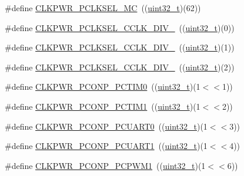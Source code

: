 \begin{DoxyCompactItemize}
\item 
\#define \hyperlink{group___c_l_k_p_w_r___public___macros_ga6f1c261af43582c0e9b2bc3ac5e603d1}{C\+L\+K\+P\+W\+R\+\_\+\+P\+C\+L\+K\+S\+E\+L\+\_\+\+MC}~((\hyperlink{_p_e___types_8h_a33594304e786b158f3fb30289278f5af}{uint32\+\_\+t})(62))
\item 
\#define \hyperlink{group___c_l_k_p_w_r___public___macros_gaf7b612823ab87d3d6358df977364b547}{C\+L\+K\+P\+W\+R\+\_\+\+P\+C\+L\+K\+S\+E\+L\+\_\+\+C\+C\+L\+K\+\_\+\+D\+I\+V\+\_}~((\hyperlink{_p_e___types_8h_a33594304e786b158f3fb30289278f5af}{uint32\+\_\+t})(0))
\item 
\#define \hyperlink{group___c_l_k_p_w_r___public___macros_ga9aaf02f3090e8a9208d261c0f984c165}{C\+L\+K\+P\+W\+R\+\_\+\+P\+C\+L\+K\+S\+E\+L\+\_\+\+C\+C\+L\+K\+\_\+\+D\+I\+V\+\_}~((\hyperlink{_p_e___types_8h_a33594304e786b158f3fb30289278f5af}{uint32\+\_\+t})(1))
\item 
\#define \hyperlink{group___c_l_k_p_w_r___public___macros_ga07e1e67993eb7f67f2b9bca8e7a1d8c8}{C\+L\+K\+P\+W\+R\+\_\+\+P\+C\+L\+K\+S\+E\+L\+\_\+\+C\+C\+L\+K\+\_\+\+D\+I\+V\+\_}~((\hyperlink{_p_e___types_8h_a33594304e786b158f3fb30289278f5af}{uint32\+\_\+t})(2))
\item 
\#define \hyperlink{group___c_l_k_p_w_r___public___macros_ga8fcd9a64da1ce162e567fd58f93361e9}{C\+L\+K\+P\+W\+R\+\_\+\+P\+C\+O\+N\+P\+\_\+\+P\+C\+T\+I\+M0}~((\hyperlink{_p_e___types_8h_a33594304e786b158f3fb30289278f5af}{uint32\+\_\+t})(1$<$$<$1))
\item 
\#define \hyperlink{group___c_l_k_p_w_r___public___macros_gabb4fde316626be32ef910804a4f1e89f}{C\+L\+K\+P\+W\+R\+\_\+\+P\+C\+O\+N\+P\+\_\+\+P\+C\+T\+I\+M1}~((\hyperlink{_p_e___types_8h_a33594304e786b158f3fb30289278f5af}{uint32\+\_\+t})(1$<$$<$2))
\item 
\#define \hyperlink{group___c_l_k_p_w_r___public___macros_ga25e8807a1107e45cb604e0cdf82da4dd}{C\+L\+K\+P\+W\+R\+\_\+\+P\+C\+O\+N\+P\+\_\+\+P\+C\+U\+A\+R\+T0}~((\hyperlink{_p_e___types_8h_a33594304e786b158f3fb30289278f5af}{uint32\+\_\+t})(1$<$$<$3))
\item 
\#define \hyperlink{group___c_l_k_p_w_r___public___macros_gaa4d6d3d86ee08058a5879fc8a3eeab25}{C\+L\+K\+P\+W\+R\+\_\+\+P\+C\+O\+N\+P\+\_\+\+P\+C\+U\+A\+R\+T1}~((\hyperlink{_p_e___types_8h_a33594304e786b158f3fb30289278f5af}{uint32\+\_\+t})(1$<$$<$4))
\item 
\#define \hyperlink{group___c_l_k_p_w_r___public___macros_ga0f01e679f3b6eec995d0fd1ad43dc2d7}{C\+L\+K\+P\+W\+R\+\_\+\+P\+C\+O\+N\+P\+\_\+\+P\+C\+P\+W\+M1}~((\hyperlink{_p_e___types_8h_a33594304e786b158f3fb30289278f5af}{uint32\+\_\+t})(1$<$$<$6))
$$
\end{DoxyCompactItemize}
